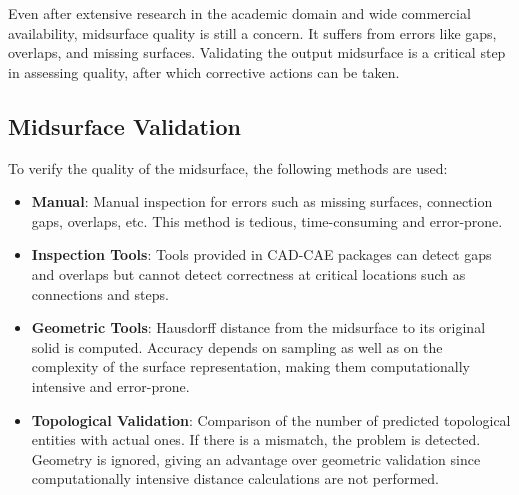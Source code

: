 \documentclass[11pt,a4paper]{article}
\begin{document}
Even after extensive research in the academic domain and wide commercial
availability, midsurface quality is still a concern. It suffers from errors
like gaps, overlaps, and missing surfaces. Validating the output midsurface
is a critical step in assessing quality, after which corrective actions can
be taken.

\subsection{Midsurface Validation}

To verify the quality of the midsurface, the following methods are used:

\begin{itemize}[noitemsep,topsep=2pt,parsep=2pt,partopsep=2pt]
\item \textbf{Manual}: Manual inspection for errors such as missing surfaces,
      connection gaps, overlaps, etc. This method is tedious, time-consuming
      and error-prone.
\item \textbf{Inspection Tools}: Tools provided in CAD-CAE packages can
      detect gaps and overlaps but cannot detect correctness at critical
      locations such as connections and steps.
\item \textbf{Geometric Tools}: Hausdorff distance from the midsurface to its
      original solid is computed. Accuracy depends on sampling as well as on
      the complexity of the surface representation, making them computationally
      intensive and error-prone.
\item \textbf{Topological Validation}: Comparison of the number of predicted
      topological entities with actual ones. If there is a mismatch, the
      problem is detected. Geometry is ignored, giving an advantage over
      geometric validation since computationally intensive distance calculations
      are not performed.
\end{itemize}

%
%
\end{document}
